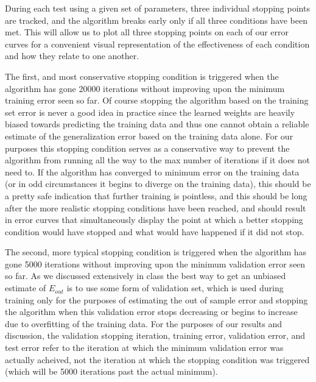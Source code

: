 \documentclass[runningheads]{llncs_2}
\begin{document}
During each test using a given set of parameters, three individual stopping points are tracked, and the algorithm breaks early only if all three conditions have been met. This will allow us to plot all three stopping points on each of our error curves for a convenient visual representation of the effectiveness of each condition and how they relate to one another. 

The first, and most conservative stopping condition is triggered when the algorithm has gone 20000 iterations without improving upon the minimum training error seen so far. Of course stopping the algorithm based on the training set error is never a good idea in practice since the learned weights are heavily biased towards predicting the training data and thus one cannot obtain a reliable estimate of the generalization error based on the training data alone. For our purposes this stopping condition serves as a conservative way to prevent the algorithm from running all the way to the max number of iterations if it does not need to. If the algorithm has converged to minimum error on the training data (or in odd circumstances it begins to diverge on the training data), this should be a pretty safe indication that further training is pointless, and this should be long after the more realistic stopping conditions have been reached, and should result in error curves that simultaneously display the point at which a better stopping condition would have stopped and what would have happened if it did not stop. 

The second, more typical stopping condition is triggered when the algorithm has gone 5000 iterations without improving upon the minimum validation error seen so far. As we discussed extensively in class the best way to get an unbiased estimate of $E_{out}$ is to use some form of validation set, which is used during training only for the purposes of estimating the out of sample error and stopping the algorithm when this validation error stops decreasing or begins to increase due to overfitting of the training data. For the purposes of our results and discussion, the validation stopping iteration, training error, validation error, and test error refer to the iteration at which the minimum validation error was actually acheived, not the iteration at which the stopping condition was triggered (which will be 5000 iterations past the actual minimum). 
\end{document}
